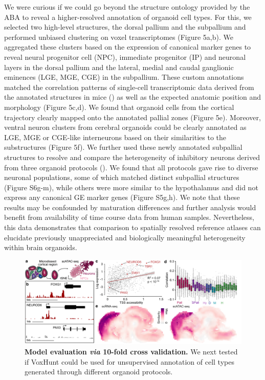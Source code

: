 We were curious if we could go beyond the structure ontology provided by the ABA to reveal a higher-resolved annotation of organoid cell types. For this, we selected two high-level structures, the dorsal pallium and the subpallium and performed unbiased clustering on voxel transcriptomes (Figure 5a,b). We aggregated these clusters based on the expression of canonical marker genes to reveal neural progenitor cell (NPC), immediate progenitor (IP) and neuronal layers in the dorsal pallium and the lateral, medial and caudal ganglionic eminences (LGE, MGE, CGE) in the subpallium. These custom annotations matched the correlation patterns of single-cell transcriptomic data derived from the annotated structures in mice (\cite{loo_single-cell_2019,mayer_developmental_2018}) as well as the expected anatomic position and morphology (Figure 5c,d). We found that organoid cells from the cortical trajectory clearly mapped onto the annotated pallial zones (Figure 5e). Moreover, ventral neuron clusters from cerebral organoids could be clearly annotated as LGE, MGE or CGE-like interneurons based on their similarities to the substructures (Figure 5f). We further used these newly annotated subpallial structures to resolve and compare the heterogeneity of inhibitory neurons derived from three organoid protocols (\cite{birey_assembly_2017,kanton_organoid_2019,xiang_hesc-derived_2019}). We found that all protocols gave rise to diverse neuronal populations, some of which matched distinct subpallial structures (Figure S6g-m), while others were more similar to the hypothalamus and did not express any canonical GE marker genes (Figure S5g,h). We note that these results may be confounded by maturation differences and further analysis would benefit from availability of time course data from human samples. Nevertheless, this data demonstrates that comparison to spatially resolved reference atlases can elucidate previously unappreciated and biologically meaningful heterogeneity within brain organoids.


\begin{figure}[b!]
    \centering
	\includegraphics[width=\textwidth]{figures/voxhunt/Figure_6}
    \caption{\textbf{Model evaluation \textit{via} 10-fold cross validation.} We next tested if VoxHunt could be used for unsupervised annotation of cell types generated through different organoid protocols.}
    \label{fig:vox6}
\end{figure}



